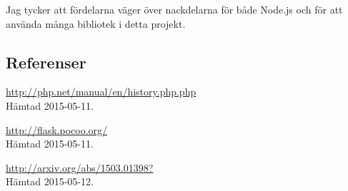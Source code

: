 Jag tycker att fördelarna väger över nackdelarna för både Node.js och för att använda många bibliotek i detta projekt.

\subsection{Referenser}
\vspace{-9mm}
\begin{thebibliography}{9}

	\url{http://php.net/manual/en/history.php.php}\\
	Hämtad 2015-05-11.
	
	\url{http://flask.pocoo.org/}\\
	Hämtad 2015-05-11.
	
	\url{http://arxiv.org/abs/1503.01398?}\\
	Hämtad 2015-05-12.
	
\end{thebibliography}